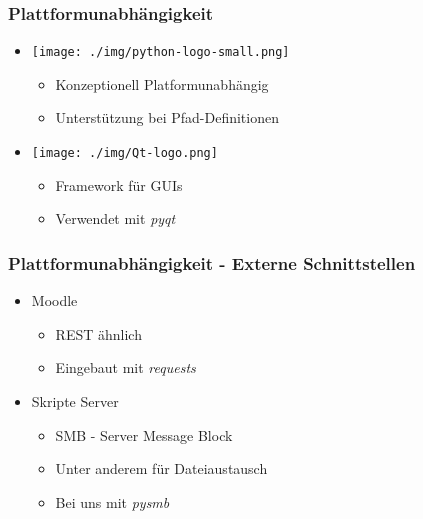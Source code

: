 \documentclass{beamer}
\begin{document}
  \begin{frame}
    \frametitle{Plattformunabhängigkeit}

    \begin{itemize}
      \item
        \texttt{[image: ./img/python-logo-small.png]}
        \begin{itemize}
          \item Konzeptionell Platformunabhängig
          \item Unterstützung bei Pfad-Definitionen
        \end{itemize}
      \item
        \texttt{[image: ./img/Qt-logo.png]}
        \begin{itemize}
          \item Framework für GUIs
          \item Verwendet mit \emph{pyqt}
        \end{itemize}
    \end{itemize}
  \end{frame}

  \begin{frame}
    \frametitle{Plattformunabhängigkeit - Externe Schnittstellen}

    \begin{itemize}
      \item Moodle
        \begin{itemize}
          \item REST ähnlich
          \item Eingebaut mit \emph{requests}
        \end{itemize}
      \item Skripte Server
        \begin{itemize}
          \item SMB - Server Message Block
          \item Unter anderem für Dateiaustausch
          \item Bei uns mit \emph{pysmb}
        \end{itemize}
    \end{itemize}
  \end{frame}
\end{document}
